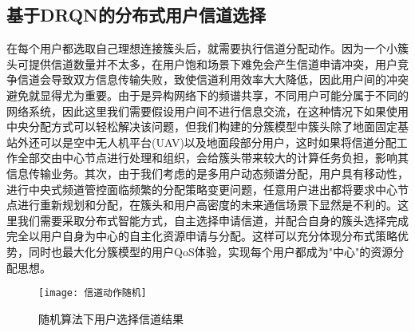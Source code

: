 \subsection{基于DRQN的分布式用户信道选择}
在每个用户都选取自己理想连接簇头后，就需要执行信道分配动作。因为一个小簇头可提供信道数量并不太多，在用户饱和场景下难免会产生信道申请冲突，用户竞争信道会导致双方信息传输失败，致使信道利用效率大大降低，因此用户间的冲突避免就显得尤为重要。由于是异构网络下的频谱共享，不同用户可能分属于不同的网络系统，因此这里我们需要假设用户间不进行信息交流，在这种情况下如果使用中央分配方式可以轻松解决该问题，但我们构建的分簇模型中簇头除了地面固定基站外还可以是空中无人机平台(UAV)以及地面段部分用户，这时如果将信道分配工作全部交由中心节点进行处理和组织，会给簇头带来较大的计算任务负担，影响其信息传输业务。其次，由于我们考虑的是多用户动态频谱分配，用户具有移动性，进行中央式频道管控面临频繁的分配策略变更问题，任意用户进出都将要求中心节点进行重新规划和分配，在簇头和用户高密度的未来通信场景下显然是不利的。这里我们需要采取分布式智能方式，自主选择申请信道，并配合自身的簇头选择完成完全以用户自身为中心的自主化资源申请与分配。这样可以充分体现分布式策略优势，同时也最大化分簇模型的用户QoS体验，实现每个用户都成为"中心"的资源分配思想。
\begin{figure}[htbp]
	\centering
	\texttt{[image: 信道动作随机]}
	\caption{随机算法下用户选择信道结果}
	\label{fig:信道随机动作}
\end{figure}

